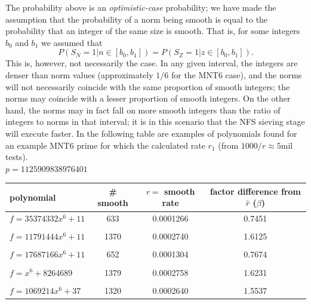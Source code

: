 \documentclass[a4paper, 10pt, envcountsect, runningheads]{article}
\numberwithin{figure}{section}
\numberwithin{equation}{section}
\begin{document}
The probability above is an {\em optimistic-case} probability; we have made the assumption that the probability of a norm being smooth is equal to the probability that an integer of the same size is smooth. That is, for some integers $b_0$ and $b_1$ we assumed that $$P(S_N=1| n\in[b_0,b_1])=P(S_Z=1| z\in[b_0,b_1]).$$ This is, however, not necessarily the case. In any given interval, the integers are denser than norm values (approximately $1/6$ for the MNT6 case), and the norms will not necessarily coincide with the same proportion of smooth integers; the norms may coincide with a lesser proportion of smooth integers. On the other hand, the norms may in fact fall on more smooth integers than the ratio of integers to norms in that interval; it is in this scenario that the NFS sieving stage will execute faster. In the following table are examples of polynomials found for an example MNT6 prime for which the calculated rate $r_1$ (from $1000/\hat{r}\approx5$mil tests).\\
\newpage
$p=1125909838976401$
\begin{center}
\begin{tabular}{l|ccc}
polynomial & \# smooth & $r=$ smooth rate & factor difference from $\hat{r}$ ($\beta$)\\
\hline
$f=35374332x^6+11$ &633&0.0001266&0.7451\\
&&&\\
$f=11791444x^6+11$ &1370&0.0002740&1.6125\\
&&&\\
$f=17687166x^6+11$ &652&0.0001304&0.7674\\
&&&\\
$f=x^6+8264689$ &1379&0.0002758&1.6231\\
&&&\\
$f=1069214x^6+37$ &1320&0.0002640&1.5537
\end{tabular}
\end{center}
\vspace{0.5cm}
\end{document}
